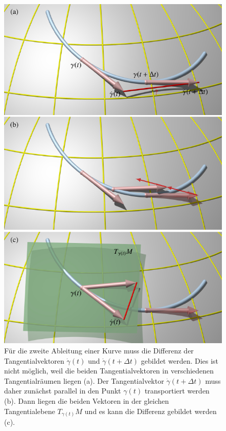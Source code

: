 %
%
%
\begin{figure}
\centering
\includegraphics{chapters/100-zusammenhang/images/differenz.pdf}
\caption{Für die zweite Ableitung einer Kurve muss die Differenz
der Tangentialvektoren $\dot{\gamma}(t)$ und $\dot{\gamma}(t+\Delta t)$
gebildet werden.
Dies ist nicht möglich, weil die beiden Tangentialvektoren in 
verschiedenen Tangentialräumen liegen (a).
Der Tangentialvektor $\dot{\gamma}(t+\Delta t)$ muss daher zunächst
parallel in den Punkt $\gamma(t)$ transportiert werden (b).
Dann liegen die beiden Vektoren in der gleichen Tangentialebene
$T_{\gamma(t)}M$ und es kann die Differenz gebildet werden (c).
\label{buch:zusammenhang:fig:differenz}}
\end{figure}
